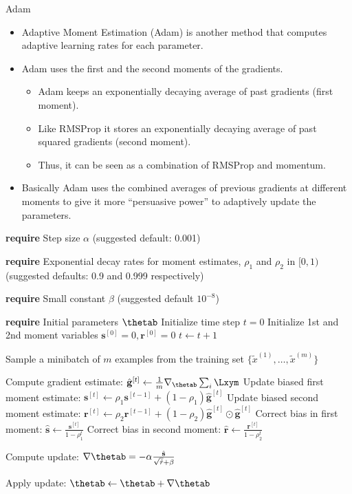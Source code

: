 \begin{vbframe}{Adam}
  \begin{itemize}
    \item Adaptive Moment Estimation (Adam) is another method that computes adaptive learning rates for each parameter.
    \item Adam uses the first and the second moments of the gradients.
      \begin{itemize}
        \item Adam keeps an exponentially decaying average of past gradients (first moment).
        \item Like RMSProp it stores an exponentially decaying average of past squared gradients (second moment).
        \item Thus, it can be seen as a combination of RMSProp and momentum.
      \end{itemize}
    \item Basically Adam uses the combined averages of previous gradients at different moments to give it more \enquote{persuasive power} to adaptively update the parameters.
  \end{itemize}
  
  
\framebreak

\begin{algorithm}[H]
  \scriptsize 
  \caption{Adam}
  \begin{algorithmic}[1]
  \State \textbf{require} Step size $\alpha$ (suggested default: 0.001) \strut
  \State \parbox[t]{\dimexpr\linewidth-\algorithmicindent}{\textbf{require} Exponential decay rates for moment estimates, $\rho_1$ and $\rho_2$ in $[0,1)$ (suggested defaults: 0.9 and 0.999 respectively)} \strut
  \State \parbox[t]{\dimexpr\linewidth-\algorithmicindent}{\textbf{require} Small constant $\beta$ (suggested default $10^{-8}$) \strut}
  \State \textbf{require} Initial parameters $\thetab$ 
  \State Initialize time step $t = 0$
  \State Initialize 1st and 2nd moment variables $\mathbf{s}^{[0]} = 0, \mathbf{r}^{[0]} = 0$
      \State $t \leftarrow t + 1$
      \State \parbox[t]{\dimexpr\linewidth-\algorithmicindent}{Sample a minibatch of $m$ examples from the training set $\{\tilde{x}^{(1)},\dots,\tilde{x}^{(m)}\}$ \strut}
      \State Compute gradient estimate: $\hat{\mathbf{g}}^{[t]} \leftarrow \frac{1}{m} \nabla_{\thetab} \sum_{i} \Lxym$
      \State Update biased first moment estimate: $\mathbf{s}^{[t]} \leftarrow \rho_1 \mathbf{s}^{[t-1]}  + (1 - \rho_1) \hat{\mathbf{g}}^{[t]}$
      \State Update biased second moment estimate: $\mathbf{r}^{[t]} \leftarrow \rho_2 \mathbf{r}^{[t-1]}  + (1 - \rho_2) \hat{\mathbf{g}}^{[t]} \odot \hat{\mathbf{g}}^{[t]}$
      \State Correct bias in first moment: $\hat{\mathbf{s}} \leftarrow \frac{\mathbf{s}^{[t]} }{1-\rho_1^t}$
      \State Correct bias in second moment: $\hat{\mathbf{r}} \leftarrow \frac{\mathbf{r}^{[t]} }{1-\rho_2^t}$
      \State \parbox[t]{\dimexpr\linewidth-\algorithmicindent}{Compute update: $\nabla\thetab = - \alpha \frac{\hat{\mathbf{s}}}{\sqrt{\hat{r}} + \beta}$ \strut}
      \State Apply update: $\thetab \leftarrow \thetab + \nabla\thetab$
      

\end{algorithmic}
\end{algorithm}
\end{vbframe}
